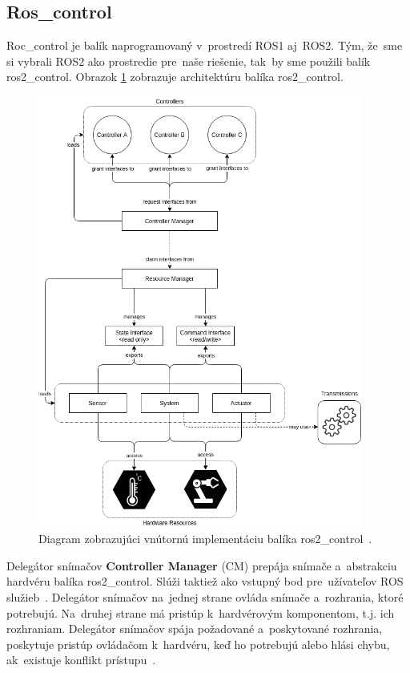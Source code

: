 \subsection{Ros\_control}
\label{subsec:roscontrol}

Roc\_control je balík naprogramovaný v~prostredí ROS1 aj~ROS2. Tým, že~sme si vybrali ROS2 ako prostredie pre~naše riešenie,
tak~by sme použili balík ros2\_control. Obrazok \ref{fig:components_architecture} zobrazuje architektúru balíka ros2\_control.

\begin{figure}[!htbp]
	\begin{center}
		\includegraphics[width=0.95\textwidth]{./img/components_architecture.png}
	\end{center}
	\caption{Diagram zobrazujúci vnútornú implementáciu balíka ros2\_control~\cite{roscontrol}.}
	\label{fig:components_architecture}
\end{figure}

Delegátor snímačov \textbf{Controller Manager} (CM) prepája snímače a~abstrakciu hardvéru balíka ros2\_control. Slúži
taktiež ako vstupný bod pre~užívateľov ROS služieb~\cite{roscontrol}.
Delegátor snímačov na~jednej strane ovláda snímače a~rozhrania, ktoré potrebujú. Na~druhej strane má pristúp k~hardvérovým
komponentom, t.j. ich rozhraniam. Delegátor snímačov spája požadované a~poskytované rozhrania, poskytuje pristúp ovládačom
k~hardvéru, keď ho potrebujú alebo hlási chybu, ak~existuje konflikt prístupu~\cite{roscontrol}.

